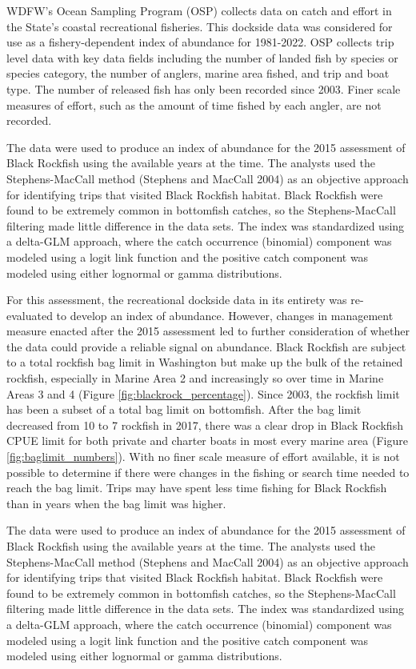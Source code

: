 \documentclass[11pt,
  letterpaper,
]{article}
\begin{document}
WDFW's Ocean Sampling Program (OSP) collects data on catch and effort in the State's coastal recreational fisheries. This dockside data was considered for use as a fishery-dependent index of abundance for 1981-2022. OSP collects trip level data with key data fields including the number of landed fish by species or species category, the number of anglers, marine area fished, and trip and boat type. The number of released fish has only been recorded since 2003. Finer scale measures of effort, such as the amount of time fished by each angler, are not recorded.

The data were used to produce an index of abundance for the 2015 assessment of Black Rockfish using the available years at the time. The analysts used the Stephens-MacCall method (Stephens and MacCall 2004) as an objective approach for identifying trips that visited Black Rockfish habitat. Black Rockfish were found to be extremely common in bottomfish catches, so the Stephens-MacCall filtering made little difference in the data sets. The index was standardized using a delta-GLM approach, where the catch occurrence (binomial) component was modeled using a logit link function and the positive catch component was modeled using either lognormal or gamma distributions.

For this assessment, the recreational dockside data in its entirety was re-evaluated to develop an index of abundance. However, changes in management measure enacted after the 2015 assessment led to further consideration of whether the data could provide a reliable signal on abundance. Black Rockfish are subject to a total rockfish bag limit in Washington but make up the bulk of the retained rockfish, especially in Marine Area 2 and increasingly so over time in Marine Areas 3 and 4 (Figure \ref{fig:blackrock_percentage}). Since 2003, the rockfish limit has been a subset of a total bag limit on bottomfish. After the bag limit decreased from 10 to 7 rockfish in 2017, there was a clear drop in Black Rockfish CPUE limit for both private and charter boats in most every marine area (Figure \ref{fig:baglimit_numbers}). With no finer scale measure of effort available, it is not possible to determine if there were changes in the fishing or search time needed to reach the bag limit. Trips may have spent less time fishing for Black Rockfish than in years when the bag limit was higher.

The data were used to produce an index of abundance for the 2015 assessment of Black Rockfish using the available years at the time. The analysts used the Stephens-MacCall method (Stephens and MacCall 2004) as an objective approach for identifying trips that visited Black Rockfish habitat. Black Rockfish were found to be extremely common in bottomfish catches, so the Stephens-MacCall filtering made little difference in the data sets. The index was standardized using a delta-GLM approach, where the catch occurrence (binomial) component was modeled using a logit link function and the positive catch component was modeled using either lognormal or gamma distributions.
\end{document}
